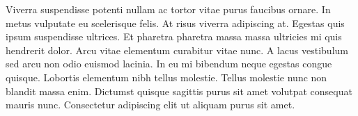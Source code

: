 Viverra suspendisse potenti nullam ac tortor vitae purus faucibus ornare. In metus vulputate eu scelerisque felis. At risus viverra adipiscing at. Egestas quis ipsum suspendisse ultrices. Et pharetra pharetra massa massa ultricies mi quis hendrerit dolor. Arcu vitae elementum curabitur vitae nunc. A lacus vestibulum sed arcu non odio euismod lacinia. In eu mi bibendum neque egestas congue quisque. Lobortis elementum nibh tellus molestie. Tellus molestie nunc non blandit massa enim. Dictumst quisque sagittis purus sit amet volutpat consequat mauris nunc. Consectetur adipiscing elit ut aliquam purus sit amet.

